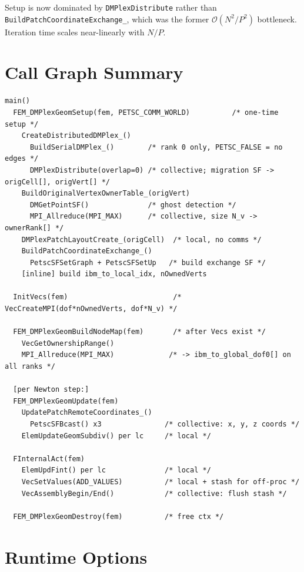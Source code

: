 \documentclass[11pt]{article}
\begin{document}
Setup is now dominated by \texttt{DMPlexDistribute} rather than
\texttt{BuildPatchCoordinateExchange\_}, which was the former $\mathcal{O}(N^2/P^2)$
bottleneck.  Iteration time scales near-linearly with $N/P$.

\section{Call Graph Summary}

\begin{lstlisting}[language={},numbers=none,frame=none,backgroundcolor=\color{white}]
main()
  FEM_DMPlexGeomSetup(fem, PETSC_COMM_WORLD)          /* one-time setup */
    CreateDistributedDMPlex_()
      BuildSerialDMPlex_()        /* rank 0 only, PETSC_FALSE = no edges */
      DMPlexDistribute(overlap=0) /* collective; migration SF -> origCell[], origVert[] */
    BuildOriginalVertexOwnerTable_(origVert)
      DMGetPointSF()              /* ghost detection */
      MPI_Allreduce(MPI_MAX)      /* collective, size N_v -> ownerRank[] */
    DMPlexPatchLayoutCreate_(origCell)  /* local, no comms */
    BuildPatchCoordinateExchange_()
      PetscSFSetGraph + PetscSFSetUp   /* build exchange SF */
    [inline] build ibm_to_local_idx, nOwnedVerts

  InitVecs(fem)                         /* VecCreateMPI(dof*nOwnedVerts, dof*N_v) */

  FEM_DMPlexGeomBuildNodeMap(fem)       /* after Vecs exist */
    VecGetOwnershipRange()
    MPI_Allreduce(MPI_MAX)             /* -> ibm_to_global_dof0[] on all ranks */

  [per Newton step:]
  FEM_DMPlexGeomUpdate(fem)
    UpdatePatchRemoteCoordinates_()
      PetscSFBcast() x3               /* collective: x, y, z coords */
    ElemUpdateGeomSubdiv() per lc     /* local */

  FInternalAct(fem)
    ElemUpdFint() per lc              /* local */
    VecSetValues(ADD_VALUES)          /* local + stash for off-proc */
    VecAssemblyBegin/End()            /* collective: flush stash */

  FEM_DMPlexGeomDestroy(fem)          /* free ctx */
\end{lstlisting}

\section{Runtime Options}
\end{document}
